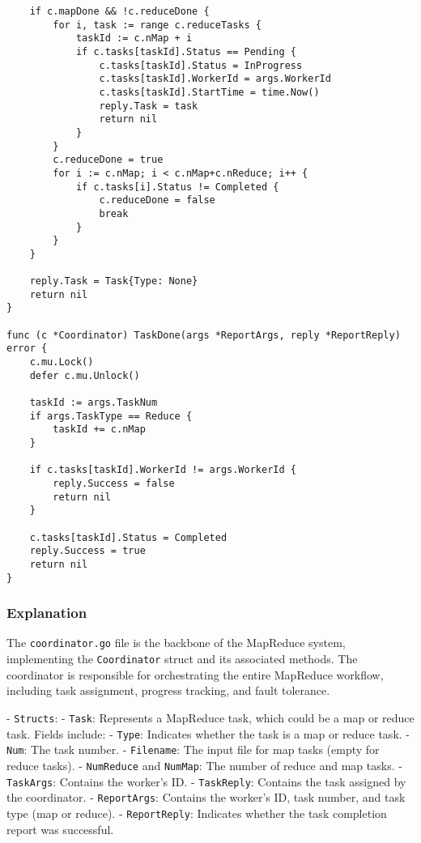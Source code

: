 \documentclass[a4paper,12pt]{article}
\begin{document}
\begin{lstlisting}
	if c.mapDone && !c.reduceDone {
		for i, task := range c.reduceTasks {
			taskId := c.nMap + i
			if c.tasks[taskId].Status == Pending {
				c.tasks[taskId].Status = InProgress
				c.tasks[taskId].WorkerId = args.WorkerId
				c.tasks[taskId].StartTime = time.Now()
				reply.Task = task
				return nil
			}
		}
		c.reduceDone = true
		for i := c.nMap; i < c.nMap+c.nReduce; i++ {
			if c.tasks[i].Status != Completed {
				c.reduceDone = false
				break
			}
		}
	}

	reply.Task = Task{Type: None}
	return nil
}

func (c *Coordinator) TaskDone(args *ReportArgs, reply *ReportReply) error {
	c.mu.Lock()
	defer c.mu.Unlock()

	taskId := args.TaskNum
	if args.TaskType == Reduce {
		taskId += c.nMap
	}

	if c.tasks[taskId].WorkerId != args.WorkerId {
		reply.Success = false
		return nil
	}

	c.tasks[taskId].Status = Completed
	reply.Success = true
	return nil
}
\end{lstlisting}

\subsubsection{Explanation}
The \texttt{coordinator.go} file is the backbone of the MapReduce system, implementing the \texttt{Coordinator} struct and its associated methods. The coordinator is responsible for orchestrating the entire MapReduce workflow, including task assignment, progress tracking, and fault tolerance.

- \texttt{Structs}:
  - \texttt{Task}: Represents a MapReduce task, which could be a map or reduce task. Fields include:
    - \texttt{Type}: Indicates whether the task is a map or reduce task.
    - \texttt{Num}: The task number.
    - \texttt{Filename}: The input file for map tasks (empty for reduce tasks).
    - \texttt{NumReduce} and \texttt{NumMap}: The number of reduce and map tasks.
  - \texttt{TaskArgs}: Contains the worker’s ID.
  - \texttt{TaskReply}: Contains the task assigned by the coordinator.
  - \texttt{ReportArgs}: Contains the worker’s ID, task number, and task type (map or reduce).
  - \texttt{ReportReply}: Indicates whether the task completion report was successful.
\end{document}
